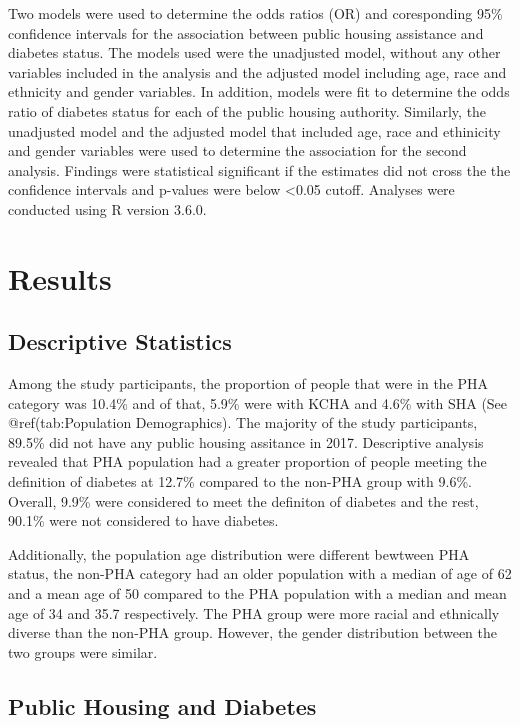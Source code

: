\documentclass [11pt, proquest] {uwthesis}[2015/03/03]
\begin{document}
Two models were used to determine the odds ratios (OR) and coresponding
95\% confidence intervals for the association between public housing
assistance and diabetes status. The models used were the unadjusted
model, without any other variables included in the analysis and the
adjusted model including age, race and ethnicity and gender variables.
In addition, models were fit to determine the odds ratio of diabetes
status for each of the public housing authority. Similarly, the
unadjusted model and the adjusted model that included age, race and
ethinicity and gender variables were used to determine the association
for the second analysis. Findings were statistical significant if the
estimates did not cross the the confidence intervals and p-values were
below \textless{}0.05 cutoff. Analyses were conducted using R version
3.6.0.

\chapter{Results}\label{ref-labels}

\section{Descriptive Statistics}\label{descriptive-statistics}

Among the study participants, the proportion of people that were in the
PHA category was 10.4\% and of that, 5.9\% were with KCHA and 4.6\% with
SHA (See @ref(tab:Population Demographics). The majority of the study
participants, 89.5\% did not have any public housing assitance in 2017.
Descriptive analysis revealed that PHA population had a greater
proportion of people meeting the definition of diabetes at 12.7\%
compared to the non-PHA group with 9.6\%. Overall, 9.9\% were considered
to meet the definiton of diabetes and the rest, 90.1\% were not
considered to have diabetes.

Additionally, the population age distribution were different bewtween
PHA status, the non-PHA category had an older population with a median
of age of 62 and a mean age of 50 compared to the PHA population with a
median and mean age of 34 and 35.7 respectively. The PHA group were more
racial and ethnically diverse than the non-PHA group. However, the
gender distribution between the two groups were similar.

\section{Public Housing and Diabetes}\label{public-housing-and-diabetes}
\end{document}
